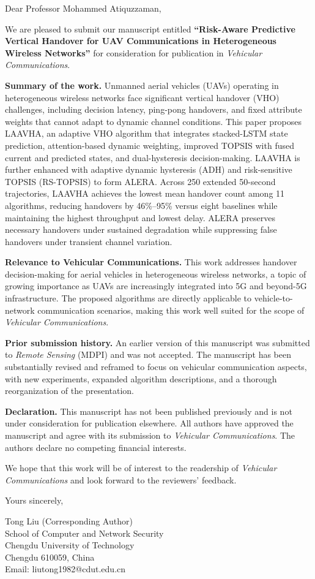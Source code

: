 \documentclass[12pt]{article}
\begin{document}
\date{\today}

Dear Professor Mohammed Atiquzzaman,

We are pleased to submit our manuscript entitled \textbf{``Risk-Aware Predictive Vertical Handover for UAV Communications in Heterogeneous Wireless Networks''} for consideration for publication in \textit{Vehicular Communications}.

\textbf{Summary of the work.}
Unmanned aerial vehicles (UAVs) operating in heterogeneous wireless networks face significant vertical handover (VHO) challenges, including decision latency, ping-pong handovers, and fixed attribute weights that cannot adapt to dynamic channel conditions. This paper proposes LAAVHA, an adaptive VHO algorithm that integrates stacked-LSTM state prediction, attention-based dynamic weighting, improved TOPSIS with fused current and predicted states, and dual-hysteresis decision-making. LAAVHA is further enhanced with adaptive dynamic hysteresis (ADH) and risk-sensitive TOPSIS (RS-TOPSIS) to form ALERA. Across 250 extended 50-second trajectories, LAAVHA achieves the lowest mean handover count among 11 algorithms, reducing handovers by 46\%--95\% versus eight baselines while maintaining the highest throughput and lowest delay. ALERA preserves necessary handovers under sustained degradation while suppressing false handovers under transient channel variation.

\textbf{Relevance to Vehicular Communications.}
This work addresses handover decision-making for aerial vehicles in heterogeneous wireless networks, a topic of growing importance as UAVs are increasingly integrated into 5G and beyond-5G infrastructure. The proposed algorithms are directly applicable to vehicle-to-network communication scenarios, making this work well suited for the scope of \textit{Vehicular Communications}.

\textbf{Prior submission history.}
An earlier version of this manuscript was submitted to \textit{Remote Sensing} (MDPI) and was not accepted. The manuscript has been substantially revised and reframed to focus on vehicular communication aspects, with new experiments, expanded algorithm descriptions, and a thorough reorganization of the presentation.

\textbf{Declaration.}
This manuscript has not been published previously and is not under consideration for publication elsewhere. All authors have approved the manuscript and agree with its submission to \textit{Vehicular Communications}. The authors declare no competing financial interests.

We hope that this work will be of interest to the readership of \textit{Vehicular Communications} and look forward to the reviewers' feedback.

Yours sincerely,

\vspace{1.5cm}

Tong Liu (Corresponding Author)\\
School of Computer and Network Security\\
Chengdu University of Technology\\
Chengdu 610059, China\\
Email: liutong1982@cdut.edu.cn
\end{document}
